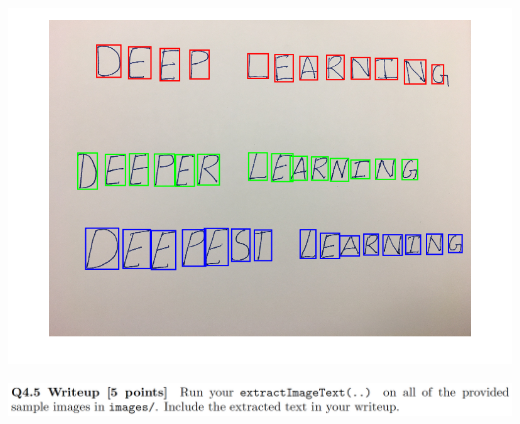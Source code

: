 \documentclass[12pt,letterpaper,boxed]{hmcpset}
\begin{document}
\begin{solution}
\includegraphics[width=\textwidth]{4_3_1.png}\\
\end{solution}
\newpage

\begin{problem}[]
\includegraphics[width=\textwidth]{4_5.png}
\end{problem}
\end{document}
